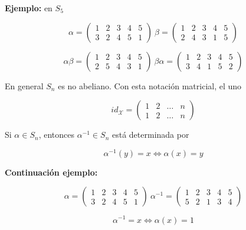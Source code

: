 \documentclass{article}
\begin{document}
\textbf{Ejemplo:} en $S_5$

\begin{equation*}
\alpha=
\begin{pmatrix}
1 & 2 & 3 & 4 & 5 \\
3 & 2 & 4 & 5 & 1
\end{pmatrix}
~\beta=
\begin{pmatrix}
1 & 2 & 3 & 4 & 5 \\
2 & 4 & 3 & 1 & 5
\end{pmatrix}
\end{equation*}

\begin{equation*}
\alpha\beta=
\begin{pmatrix}
1 & 2 & 3 & 4 & 5 \\
2 & 5 & 4 & 3 & 1
\end{pmatrix}
~\beta\alpha=
\begin{pmatrix}
1 & 2 & 3 & 4 & 5 \\
3 & 4 & 1 & 5 & 2
\end{pmatrix}
\end{equation*}

En general $S_n$ es no abeliano. Con esta notación matricial, el uno

\begin{equation*}
id_\mathcal{X}=
\begin{pmatrix}
1 & 2 & \ldots & n \\
1 & 2 & \ldots & n 
\end{pmatrix}
\end{equation*}

Si $\alpha \in S_n$, entonces $\alpha^{-1}\in S_n$ está determinada por

\begin{equation*}
\alpha^{-1}(y)=x\Leftrightarrow \alpha(x)=y
\end{equation*}

\textbf{Continuación ejemplo:}

\begin{equation*}
\alpha=
\begin{pmatrix}
1 & 2 & 3 & 4 & 5 \\
3 & 2 & 4 & 5 & 1 
\end{pmatrix}
~\alpha^{-1}=
\begin{pmatrix}
1 & 2 & 3 & 4 & 5 \\
5 & 2 & 1 & 3 & 4
\end{pmatrix}
\end{equation*}

\begin{equation*}
\alpha^{-1}=x \Leftrightarrow \alpha(x)=1
\end{equation*}
\end{document}
